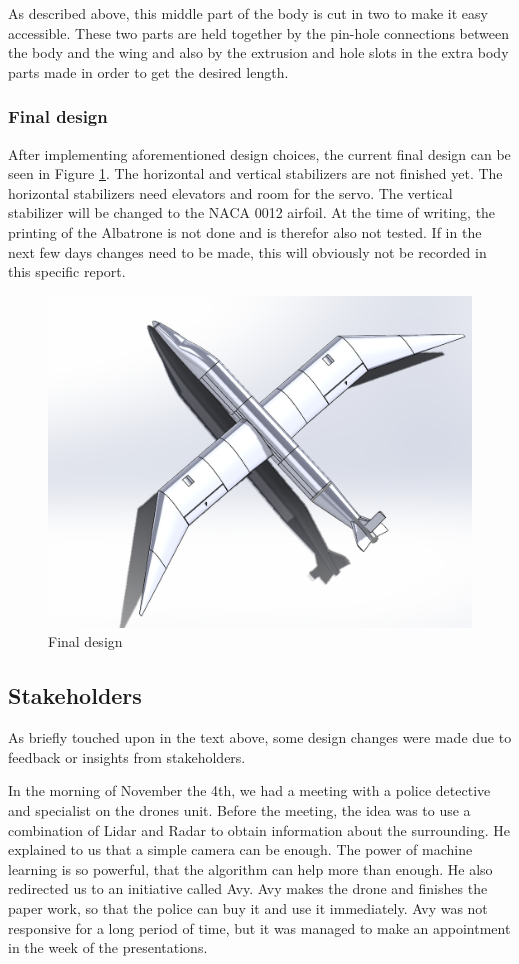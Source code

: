 As described above, this middle part of the body is cut in two to make it easy accessible. These two parts are held together by the pin-hole connections between the body and the wing and also by the extrusion and hole slots in the extra body parts made in order to get the desired length.\\

\subsubsection{Final design}
After implementing aforementioned design choices, the current final design can be seen in Figure \ref{fig:Final design}. The horizontal and vertical stabilizers are not finished yet. The horizontal stabilizers need elevators and room for the servo. The vertical stabilizer will be changed to the NACA 0012 airfoil. At the time of writing, the printing of the Albatrone is not done and is therefor also not tested. If in the next few days changes need to be made, this will obviously not be recorded in this specific report.

\begin{figure}
    \centering
    \includegraphics[width=0.5\linewidth]{images/Final design.png}
    \caption{Final design}
    \label{fig:Final design}
\end{figure}

\subsection{Stakeholders}
As briefly touched upon in the text above, some design changes were made due to feedback or insights from stakeholders.

In the morning of November the 4th, we had a meeting with a police detective and specialist on the drones unit. Before the meeting, the idea was to use a combination of Lidar and Radar to obtain information about the surrounding. He explained to us that a simple camera can be enough. The power of machine learning is so powerful, that the algorithm can help more than enough. He also redirected us to an initiative called Avy. Avy makes the drone and finishes the paper work, so that the police can buy it and use it immediately. Avy was not responsive for a long period of time, but it was managed to make an appointment in the week of the presentations.

